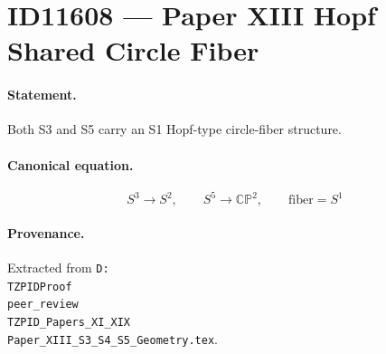 \section*{ID11608 --- Paper XIII Hopf Shared Circle Fiber}

\paragraph{Statement.}
Both S3 and S5 carry an S1 Hopf-type circle-fiber structure.

\paragraph{Canonical equation.}
\[
S^3\to S^2,\qquad S^5\to\mathbb{CP}^2,\qquad \mathrm{fiber}=S^1
\]

\paragraph{Provenance.}
Extracted from \texttt{D:\\TZPIDProof\\peer\_review\\TZPID\_Papers\_XI\_XIX\\Paper\_XIII\_S3\_S4\_S5\_Geometry.tex}.

